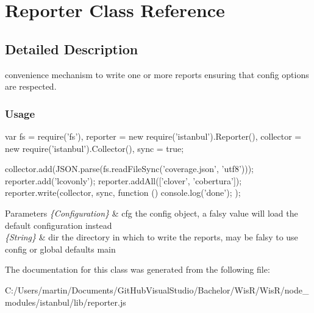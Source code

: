 \hypertarget{class_reporter}{}\section{Reporter Class Reference}
\label{class_reporter}


\subsection{Detailed Description}
convenience mechanism to write one or more reports ensuring that config options are respected. \subsubsection*{Usage }

\begin{DoxyVerb} var fs = require('fs'),
     reporter = new require('istanbul').Reporter(),
     collector = new require('istanbul').Collector(),
     sync = true;

 collector.add(JSON.parse(fs.readFileSync('coverage.json', 'utf8')));
 reporter.add('lcovonly');
 reporter.addAll(['clover', 'cobertura']);
 reporter.write(collector, sync, function () { console.log('done'); });
\end{DoxyVerb}



\begin{DoxyParams}{Parameters}
{\em \{\+Configuration\}} & cfg the config object, a falsy value will load the default configuration instead \\
\hline
{\em \{\+String\}} & dir the directory in which to write the reports, may be falsy to use config or global defaults   main \\
\hline
\end{DoxyParams}


The documentation for this class was generated from the following file\+:\begin{DoxyCompactItemize}
\item 
C\+:/\+Users/martin/\+Documents/\+Git\+Hub\+Visual\+Studio/\+Bachelor/\+Wis\+R/\+Wis\+R/node\+\_\+modules/istanbul/lib/reporter.\+js\end{DoxyCompactItemize}
